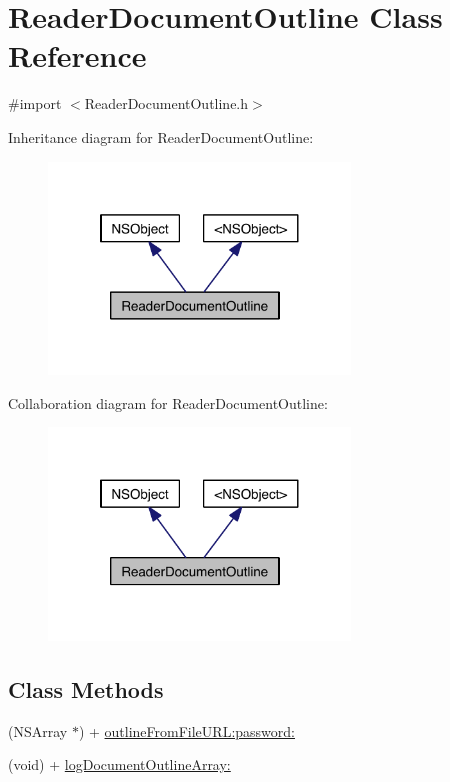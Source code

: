 \hypertarget{interface_reader_document_outline}{\section{Reader\-Document\-Outline Class Reference}
\label{d6/d28/interface_reader_document_outline}
}


{\ttfamily \#import $<$Reader\-Document\-Outline.\-h$>$}



Inheritance diagram for Reader\-Document\-Outline\-:
\nopagebreak
\begin{figure}[H]
\begin{center}
\leavevmode
\includegraphics[width=227pt]{d5/dfc/interface_reader_document_outline__inherit__graph}
\end{center}
\end{figure}


Collaboration diagram for Reader\-Document\-Outline\-:
\nopagebreak
\begin{figure}[H]
\begin{center}
\leavevmode
\includegraphics[width=227pt]{d4/dc5/interface_reader_document_outline__coll__graph}
\end{center}
\end{figure}
\subsection*{Class Methods}
\begin{DoxyCompactItemize}
\item 
(N\-S\-Array $\ast$) + \hyperlink{interface_reader_document_outline_aeeb9f682b0b0e07a65ceb5b7aece0dc6}{outline\-From\-File\-U\-R\-L\-:password\-:}
\item 
(void) + \hyperlink{interface_reader_document_outline_a3ba49af0876f15f2a2460c0351de561e}{log\-Document\-Outline\-Array\-:}
\end{DoxyCompactItemize}


